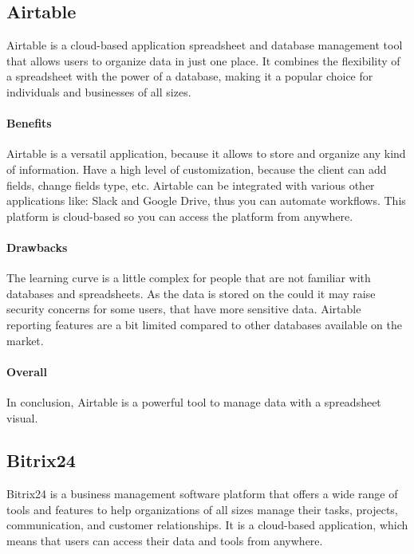 \documentclass{article}
\begin{document}
\subsection{Airtable}

Airtable is a cloud-based application spreadsheet and database management tool that allows users to organize data in just one place. It combines the flexibility of a spreadsheet with the power of a database, making it a popular choice for individuals and businesses of all sizes.

\paragraph{Benefits}

Airtable is a versatil application, because it allows to store and organize any kind of information. Have a high level of customization, because the client can add fields, change fields type, etc. Airtable can be integrated with various other applications like: Slack and Google Drive, thus you can automate workflows. This platform is cloud-based so you can access the platform from anywhere.

\paragraph{Drawbacks}

The learning curve is a little complex for people that are not familiar with databases and spreadsheets. As the data is stored on the could it may raise security concerns for some users, that have more sensitive data. Airtable reporting features are a bit limited compared to other databases available on the market.

\paragraph{Overall}

In conclusion, Airtable is a powerful tool to manage data with a spreadsheet visual.

\subsection{Bitrix24}

Bitrix24 is a business management software platform that offers a wide range of tools and features to help organizations of all sizes manage their tasks, projects, communication, and customer relationships. It is a cloud-based application, which means that users can access their data and tools from anywhere.
\end{document}
